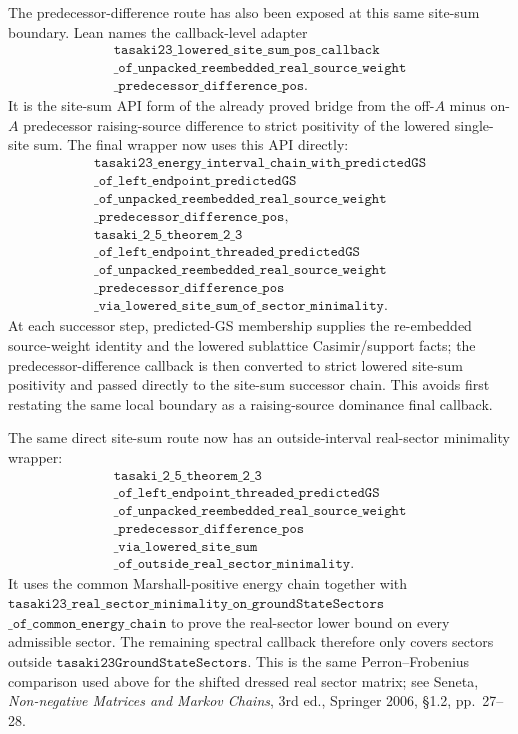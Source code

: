 \documentclass[a4paper,11pt]{article}
\begin{document}
The predecessor-difference route has also been exposed at this same
site-sum boundary.  Lean names the callback-level adapter
\[
\begin{gathered}
\texttt{tasaki23\_lowered\_site\_sum\_pos\_callback}\\
\texttt{\_of\_unpacked\_reembedded\_real\_source\_weight}\\
\texttt{\_predecessor\_difference\_pos}.
\end{gathered}
\]
It is the site-sum API form of the already proved bridge from the
off-\(A\) minus on-\(A\) predecessor raising-source difference to
strict positivity of the lowered single-site sum.  The final wrapper now
uses this API directly:
\[
\begin{gathered}
\texttt{tasaki23\_energy\_interval\_chain\_with\_predictedGS}\\
\texttt{\_of\_left\_endpoint\_predictedGS}\\
\texttt{\_of\_unpacked\_reembedded\_real\_source\_weight}\\
\texttt{\_predecessor\_difference\_pos},\\
\texttt{tasaki\_2\_5\_theorem\_2\_3}\\
\texttt{\_of\_left\_endpoint\_threaded\_predictedGS}\\
\texttt{\_of\_unpacked\_reembedded\_real\_source\_weight}\\
\texttt{\_predecessor\_difference\_pos}\\
\texttt{\_via\_lowered\_site\_sum\_of\_sector\_minimality}.
\end{gathered}
\]
At each successor step, predicted-GS membership supplies the
re-embedded source-weight identity and the lowered sublattice
Casimir/support facts; the predecessor-difference callback is then
converted to strict lowered site-sum positivity and passed directly to
the site-sum successor chain.  This avoids first restating the same local
boundary as a raising-source dominance final callback.

The same direct site-sum route now has an outside-interval real-sector
minimality wrapper:
\[
\begin{gathered}
\texttt{tasaki\_2\_5\_theorem\_2\_3}\\
\texttt{\_of\_left\_endpoint\_threaded\_predictedGS}\\
\texttt{\_of\_unpacked\_reembedded\_real\_source\_weight}\\
\texttt{\_predecessor\_difference\_pos}\\
\texttt{\_via\_lowered\_site\_sum}\\
\texttt{\_of\_outside\_real\_sector\_minimality}.
\end{gathered}
\]
It uses the common Marshall-positive energy chain together with
\(\texttt{tasaki23\_real\_sector\_minimality\_on\_groundStateSectors}\)
\(\texttt{\_of\_common\_energy\_chain}\) to prove the real-sector
lower bound on every admissible sector.  The remaining spectral
callback therefore only covers sectors outside
\(\texttt{tasaki23GroundStateSectors}\).  This is the same
Perron--Frobenius comparison used above for the shifted dressed real
sector matrix; see Seneta, \emph{Non-negative Matrices and Markov
Chains}, 3rd ed., Springer 2006, \S1.2, pp.~27--28.
\end{document}
